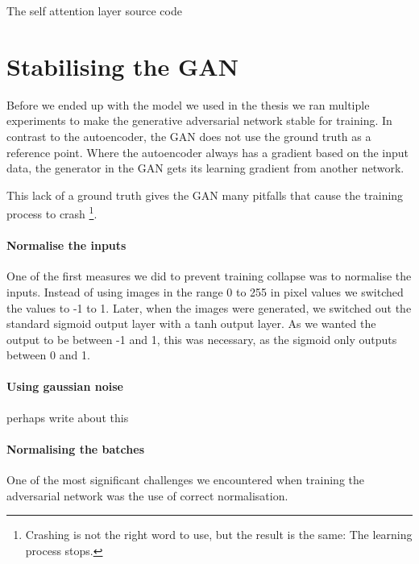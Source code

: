 \begin{minipage}{\linewidth}
\begin{listing}

\caption{The self attention layer source code}
\label{listing:maskedMSE}
\end{listing}
\end{minipage}





\section{Stabilising the GAN}
Before we ended up with the model we used in the thesis we ran multiple experiments to make the generative adversarial network stable for training. 
In contrast to the autoencoder, the GAN does not use the ground truth as a reference point. Where the autoencoder always has a gradient based on the input data, the generator in the GAN gets its learning gradient from another network.

This lack of a ground truth gives the GAN many pitfalls that cause the training process to crash \footnote{Crashing is not the right word to use, but the result is the same: The learning process stops.}.


\paragraph{Normalise the inputs}
One of the first measures we did to prevent training collapse was to normalise the inputs. Instead of using images in the range 0 to 255 in pixel values we switched the values to  -1 to 1. 
Later, when the images were generated, we switched out the standard sigmoid output layer with a tanh output layer. As we wanted the output to be between -1 and 1, this was necessary, as the sigmoid only outputs between 0 and 1.

\paragraph{Using gaussian noise}
perhaps write about this



\paragraph{Normalising the batches}
One of the most significant challenges we encountered when training the adversarial network was the use of correct normalisation. 

